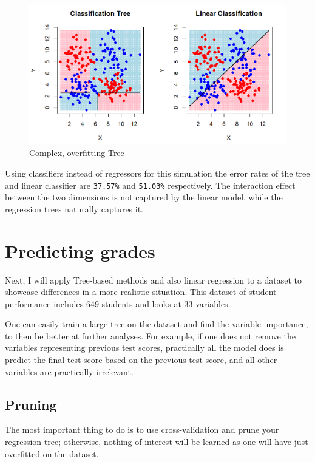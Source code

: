 \documentclass[12pt]{article}
\begin{document}
\begin{figure}
    \centering
    \includegraphics[scale=0.30]{NLD Pred.png}
    \caption{Complex, overfitting Tree}
\end{figure}

Using classifiers instead of regressors for this simulation the error rates of the tree and linear classifier are \texttt{37.57\%} and \texttt{51.03\%} respectively. The interaction effect between the two dimensions is not captured by the linear model, while the regression trees naturally captures it.


\section{Predicting grades}

Next, I will apply Tree-based methods and also linear regression to a dataset to showcase differences in a more realistic situation. This dataset of student performance includes 649 students and looks at 33 variables.

One can easily train a large tree on the dataset and find the variable importance, to then be better at further analyses. For example, if one does not remove the variables representing previous test scores, practically all the model does is predict the final test score based on the previous test score, and all other variables are practically irrelevant.


\subsection{Pruning}

The most important thing to do is to use cross-validation and prune your regression tree; otherwise, nothing of interest will be learned as one will have just overfitted on the dataset.
\end{document}
